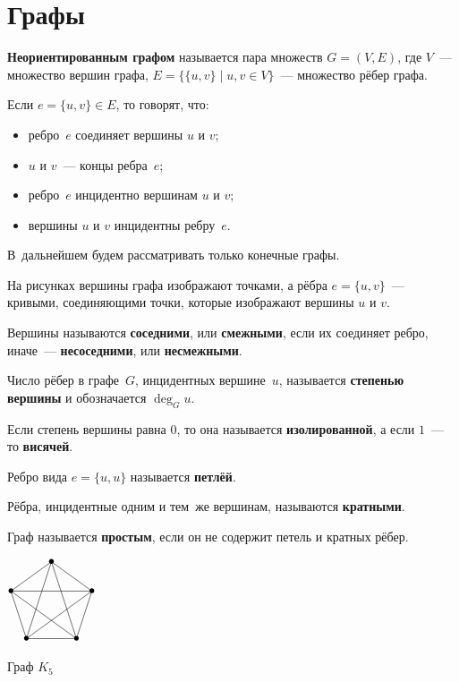 \section{Графы}
\textbf{Неориентированным графом} называется пара множеств $G = (V, E)$, где $V$~--- множество вершин графа, $E = \{ \{ u, v \} \mid u, v \in V \}$~--- множество рёбер графа.

Если $e = \{ u, v \} \in E$, то говорят, что:
\begin{itemize}
	\item ребро~$e$ соединяет вершины $u$ и $v$;
	\item $u$ и $v$~--- концы ребра~$e$;
	\item ребро~$e$ инцидентно вершинам $u$ и $v$;
	\item вершины $u$ и $v$ инцидентны ребру~$e$.
\end{itemize}

В~дальнейшем будем рассматривать только конечные графы.

На рисунках вершины графа изображают точками, а рёбра $e = \{ u, v \}$~--- кривыми, соединяющими точки, которые изображают вершины $u$ и $v$.

Вершины называются \textbf{соседними}, или \textbf{смежными}, если их соединяет ребро, иначе~--- \textbf{несоседними}, или \textbf{несмежными}.

 Число рёбер в графе~$G$, инцидентных вершине~$u$, называется \textbf{степенью вершины} и обозначается $\deg_G u$.

Если степень вершины равна $0$, то она называется \textbf{изолированной}, а если $1$~--- то \textbf{висячей}.

 Ребро вида $e = \{ u, u \}$ называется \textbf{петлёй}.

Рёбра, инцидентные одним и тем~же вершинам, называются \textbf{кратными}.

Граф называется \textbf{простым}, если он не содержит петель и кратных рёбер.

\begin{floatingfigure}[r]{30mm} \centering
\noindent
$\begin{xy} /r0.4mm/:
(30, 60) = "1" *{\bullet}; %
(58.532, 39.271) = "2" *{\bullet}; %
(47.634, 5.729) = "3" *{\bullet}; %
(12.366, 5.729) = "4" *{\bullet}; %
(1.468, 39.271) = "5" *{\bullet}; %
"5"; "1" **@{-}; "2" **@{-}; "3" **@{-}; "4" **@{-}; "5" **@{-};
"2" **@{-}; "4" **@{-}; "1" **@{-}; "3" **@{-}; "5" **@{-};
\end{xy}$
\caption{Граф $K_5$}
\end{floatingfigure}

